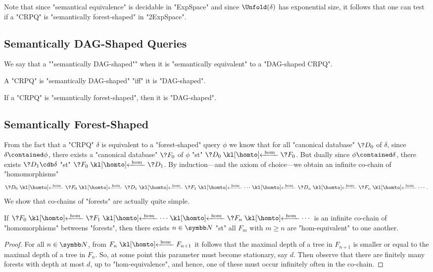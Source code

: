Note that since "semantical equivalence" is decidable in "ExpSpace" and
since $\Unfold(\delta)$ has exponential size, it follows that one can test if
a "CRPQ" is "semantically forest-shaped" in "2ExpSpace".

\subsection{Semantically DAG-Shaped Queries}

We say that a ""semantically DAG-shaped"" when it is "semantically equivalent"
to a "DAG-shaped CRPQ".

\begin{fact}
	A "CRPQ" is "semantically DAG-shaped" "iff" it is "DAG-shaped".
\end{fact}

\begin{corollary}
	\AP\label{coro:sem-forest-implies-DAG}
	If a "CRPQ" is "semantically forest-shaped", then it is "DAG-shaped".
\end{corollary}

\subsection{Semantically Forest-Shaped}

From the fact that a "CRPQ" $\delta$ is equivalent to a "forest-shaped" query $\phi$
we know that for all "canonical database" $\?D_0$ of $\delta$, since $\delta \contained \phi$,
there exists a "canonical database" $\?F_0$ of $\phi$ "st" $\?D_0 \cohomto \?F_0$.
But dually since $\phi \contained \delta$, there exists $\?D_1 \cdb \delta$ "st" $\?F_0 \cohomto \?D_1$.
By induction---and the axiom of choice---we obtain an infinite co-chain of "homomorphisms"
\[
	\?D_0 \cohomto \?F_0 \cohomto \?D_1 \cohomto \?F_1 \cohomto \cdots \cohomto \?D_n \cohomto \?F_n \cohomto \cdots.
\]
We show that co-chains of "forests" are actually quite simple.

\begin{fact}
	If $\?F_0 \cohomto \?F_1 \cohomto \cdots \cohomto \?F_n \cohomto \cdots$
	is an infinite co-chain of "homomorphisms" betweens "forests", 
	then there exists $n \in \N$ "st" all $F_m$ with $m\geq n$
	are "hom-equivalent" to one another.
\end{fact}

\begin{proof}
	For all $n \in \N$, from $F_n \cohomto F_{n+1}$ it follows that
	the maximal depth of a tree in $F_{n+1}$ is smaller or equal to the
	maximal depth of a tree in $F_{n}$. So, at some point this parameter
	must become stationary, say $d$. Then observe that there
	are finitely many forests with depth at most $d$, up to "hom-equivalence",
	and hence, one of these must occur infinitely often in the co-chain.
\end{proof}

